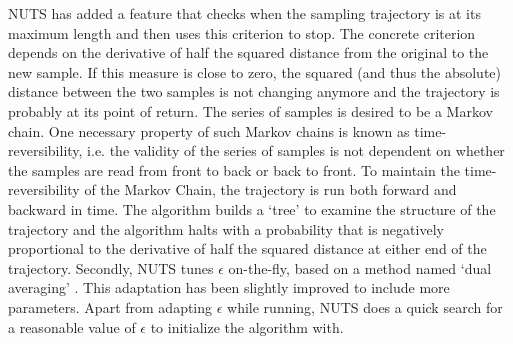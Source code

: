 NUTS has added a feature that checks when the sampling trajectory is at its maximum length and then uses this criterion to stop. The concrete criterion depends on the derivative of half the squared distance from the original to the new sample. If this measure is close to zero, the squared (and thus the absolute) distance between the two samples is not changing anymore and the trajectory is probably at its point of return. The series of samples is desired to be a Markov chain. One necessary property of such Markov chains is known as time-reversibility, i.e. the validity of the series of samples is not dependent on whether the samples are read from front to back or back to front. To maintain the time-reversibility of the Markov Chain, the trajectory is run both forward and backward in time. The algorithm builds a `tree' to examine the structure of the trajectory and the algorithm halts with a probability that is negatively proportional to the derivative of half the squared distance at either end of the trajectory. 
Secondly, NUTS tunes $\epsilon$ on-the-fly, based on a method named `dual averaging' \cite{nesterov2009primal}. This adaptation has been slightly improved to include more parameters. Apart from adapting $\epsilon$ while running, NUTS does a quick search for a reasonable value of $\epsilon$ to initialize the algorithm with.

